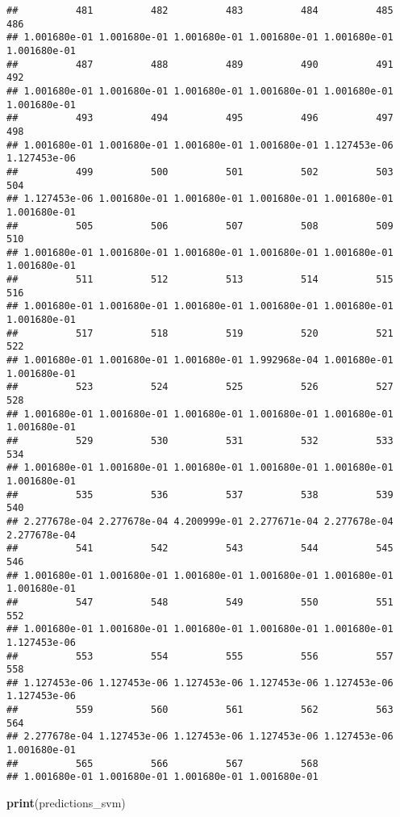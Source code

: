 \documentclass[
]{article}
\newenvironment{Shaded}{\begin{snugshade}}{\end{snugshade}}
\newcommand{\FunctionTok}[1]{\textcolor[rgb]{0.13,0.29,0.53}{\textbf{#1}}}
\newcommand{\NormalTok}[1]{#1}
\begin{document}
\begin{verbatim}
##          481          482          483          484          485          486 
## 1.001680e-01 1.001680e-01 1.001680e-01 1.001680e-01 1.001680e-01 1.001680e-01 
##          487          488          489          490          491          492 
## 1.001680e-01 1.001680e-01 1.001680e-01 1.001680e-01 1.001680e-01 1.001680e-01 
##          493          494          495          496          497          498 
## 1.001680e-01 1.001680e-01 1.001680e-01 1.001680e-01 1.127453e-06 1.127453e-06 
##          499          500          501          502          503          504 
## 1.127453e-06 1.001680e-01 1.001680e-01 1.001680e-01 1.001680e-01 1.001680e-01 
##          505          506          507          508          509          510 
## 1.001680e-01 1.001680e-01 1.001680e-01 1.001680e-01 1.001680e-01 1.001680e-01 
##          511          512          513          514          515          516 
## 1.001680e-01 1.001680e-01 1.001680e-01 1.001680e-01 1.001680e-01 1.001680e-01 
##          517          518          519          520          521          522 
## 1.001680e-01 1.001680e-01 1.001680e-01 1.992968e-04 1.001680e-01 1.001680e-01 
##          523          524          525          526          527          528 
## 1.001680e-01 1.001680e-01 1.001680e-01 1.001680e-01 1.001680e-01 1.001680e-01 
##          529          530          531          532          533          534 
## 1.001680e-01 1.001680e-01 1.001680e-01 1.001680e-01 1.001680e-01 1.001680e-01 
##          535          536          537          538          539          540 
## 2.277678e-04 2.277678e-04 4.200999e-01 2.277671e-04 2.277678e-04 2.277678e-04 
##          541          542          543          544          545          546 
## 1.001680e-01 1.001680e-01 1.001680e-01 1.001680e-01 1.001680e-01 1.001680e-01 
##          547          548          549          550          551          552 
## 1.001680e-01 1.001680e-01 1.001680e-01 1.001680e-01 1.001680e-01 1.127453e-06 
##          553          554          555          556          557          558 
## 1.127453e-06 1.127453e-06 1.127453e-06 1.127453e-06 1.127453e-06 1.127453e-06 
##          559          560          561          562          563          564 
## 2.277678e-04 1.127453e-06 1.127453e-06 1.127453e-06 1.127453e-06 1.001680e-01 
##          565          566          567          568 
## 1.001680e-01 1.001680e-01 1.001680e-01 1.001680e-01
\end{verbatim}

\begin{Shaded}
\begin{Highlighting}[]
\FunctionTok{print}\NormalTok{(predictions\_svm)}
\end{Highlighting}
\end{Shaded}
\end{document}
